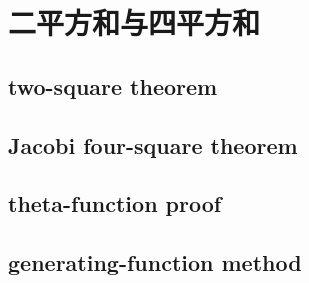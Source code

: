 \section{二平方和与四平方和}
\label{b3:sec:2404}


\subsection{two-square theorem}
\label{b3:subsec:240401}

\subsection{Jacobi four-square theorem}
\label{b3:subsec:240402}

\subsection{theta-function proof}
\label{b3:subsec:240403}

\subsection{generating-function method}
\label{b3:subsec:240404}


